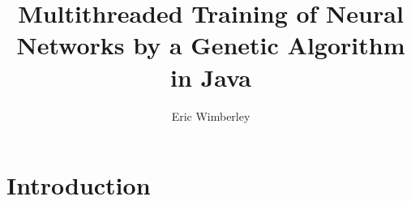 \documentclass[twocolumn]{article}
\title{Multithreaded Training of Neural Networks by a Genetic Algorithm in Java}
\author{Eric Wimberley}
\begin{document}
\maketitle

\begin{abstract}
\lipsum[1-3]
\end{abstract}

\section{Introduction}
\lipsum[1-10]
\end{document}
